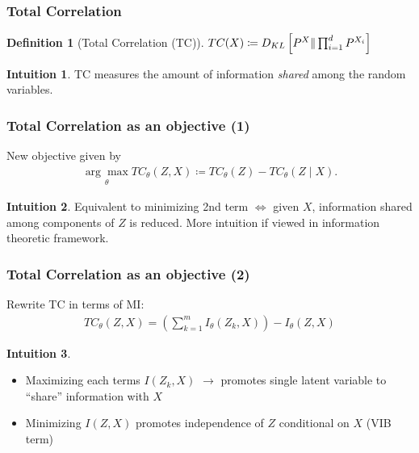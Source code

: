\documentclass{beamer}
\theoremstyle{definition}
\newtheorem{definition}[section]{Definition}
\newtheorem{intuition}{Intuition}
\begin{document}
    \begin{frame}
      \frametitle{Total Correlation}
      \begin{definition}[Total Correlation (TC)]
        $TC(X) \coloneqq D_{KL}\left[P^{X} \large  \Vert \prod_{i=1}^{d}P^{{X_{i}}}\right] $
      \end{definition}
      \begin{intuition}
        TC measures the amount of information \textit{shared} among the random variables.
      \end{intuition}
    \end{frame}

    \begin{frame}
      \frametitle{Total Correlation as an objective (1)}
      New objective given by
      \begin{align*}
        \underset{\theta}{\arg \max}TC_{\theta}(Z, X) \coloneqq TC_{\theta}(Z) - TC_{\theta}(Z \mid X).
      \end{align*}
      \begin{intuition}
        Equivalent to minimizing 2nd term $\iff$ given $X$, information shared among components of $Z$ is reduced.
        \newline
        More intuition if viewed in information theoretic framework.
      \end{intuition}
    \end{frame}

    \begin{frame}
      \frametitle{Total Correlation as an objective (2)}
      Rewrite TC in terms of MI:
      \begin{align*}
        TC_{\theta}(Z, X) = \left(\sum_{k=1}^{m}I_{\theta}(Z_{k}, X)\right) - I_{\theta}(Z, X)
      \end{align*}
      \begin{intuition}
        \begin{itemize}
          \item Maximizing each terms $I(Z_{k}, X)$ $\to$ promotes single latent variable to \enquote{share} information with $X$
          \item Minimizing $I(Z, X)$ promotes independence of $Z$ conditional on $X$ (VIB term)
        \end{itemize}
      \end{intuition}
    \end{frame}
\end{document}
